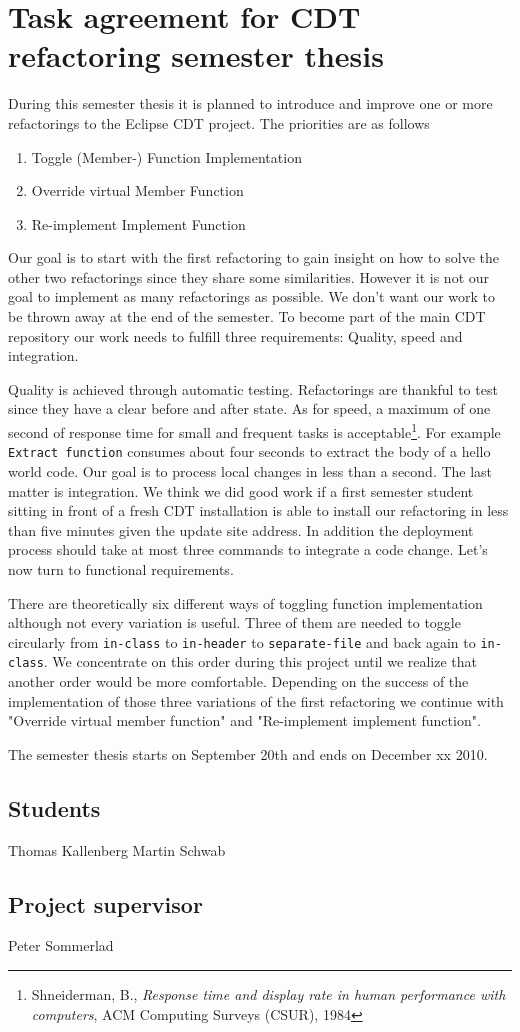 \documentclass[a4paper,10pt]{scrreprt}
\begin{document}
\section*{Task agreement for CDT refactoring semester thesis}

During this semester thesis it is planned to introduce and improve one or more refactorings to the Eclipse CDT project. The priorities are as follows

\begin{enumerate}
\item Toggle (Member-) Function Implementation
\item Override virtual Member Function
\item Re-implement Implement Function
\end{enumerate}

Our goal is to start with the first refactoring to gain insight on how to solve the other two refactorings since they share some similarities. However it is not our goal to implement as many refactorings as possible. We don't want our work to be thrown away at the end of the semester. To become part of the main CDT repository our work needs to fulfill three requirements: Quality, speed and integration. \newline

Quality is achieved through automatic testing. Refactorings are thankful to test since they have a clear before and after state. As for speed, a maximum of one second of response time for small and frequent tasks is acceptable\footnote{Shneiderman, B., \emph{Response time and display rate in human performance with computers}, ACM Computing Surveys (CSUR), 1984}. For example \texttt{Extract function} consumes about four seconds to extract the body of a hello world code. Our goal is to process local changes in less than a second. The last matter is integration. We think we did good work if a first semester student sitting in front of a fresh CDT installation is able to install our refactoring in less than five minutes given the update site address. In addition the deployment process should take at most three commands to integrate a code change. Let's now turn to functional requirements. \newline

There are theoretically six different ways of toggling function implementation although not every variation is useful. Three of them are needed to toggle circularly from \texttt{in-class} to \texttt{in-header} to \texttt{separate-file} and back again to \texttt{in-class}. We concentrate on this order during this project until we realize that another order would be more comfortable. Depending on the success of the implementation of those three variations of the first refactoring we continue with "Override virtual member function" and "Re-implement implement function". \newline

The semester thesis starts on September 20th and ends on December xx 2010.

\subsection*{Students}
Thomas Kallenberg \dotfill
Martin Schwab \dotfill
\subsection*{Project supervisor}
Peter Sommerlad \dotfill
~ \newline 
\end{document}
